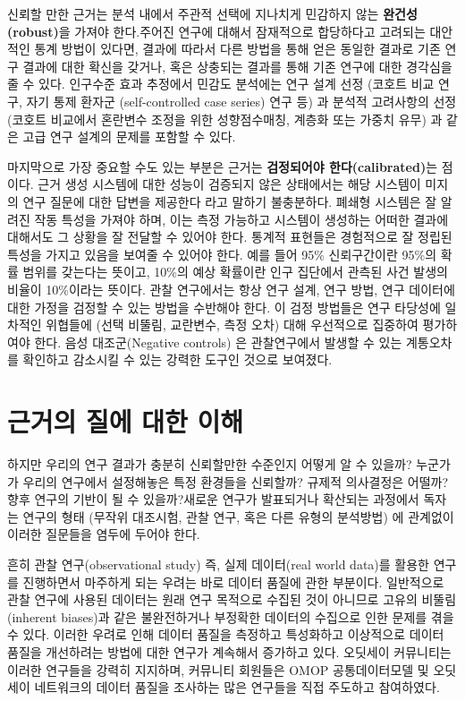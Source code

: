 \documentclass[11pt]{book}
\theoremstyle{definition}
\theoremstyle{definition}
\theoremstyle{definition}
\theoremstyle{remark}
\begin{document}
신뢰할 만한 근거는 분석 내에서 주관적 선택에 지나치게 민감하지 않는
\textbf{완건성(robust)}을 가져야 한다.주어진 연구에 대해서 잠재적으로
합당하다고 고려되는 대안적인 통계 방법이 있다면, 결과에 따라서 다른
방법을 통해 얻은 동일한 결과로 기존 연구 결과에 대한 확신을 갖거나, 혹은
상충되는 결과를 통해 기존 연구에 대한 경각심을 줄 수 있다.
\citep{madigan2013design} 인구수준 효과 추정에서 민감도 분석에는 연구
설계 선정 (코호트 비교 연구, 자기 통제 환자군 (self-controlled case
series) 연구 등) 과 분석적 고려사항의 선정 (코호트 비교에서 혼란변수
조정을 위한 성향점수매칭, 계층화 또는 가중치 유무) 과 같은 고급 연구
설계의 문제를 포함할 수 있다.

마지막으로 가장 중요할 수도 있는 부분은 근거는 \textbf{검정되어야
한다(calibrated)}는 점이다. 근거 생성 시스템에 대한 성능이 검증되지 않은
상태에서는 해당 시스템이 미지의 연구 질문에 대한 답변을 제공한다 라고
말하기 불충분하다. 폐쇄형 시스템은 잘 알려진 작동 특성을 가져야 하며,
이는 측정 가능하고 시스템이 생성하는 어떠한 결과에 대해서도 그 상황을 잘
전달할 수 있어야 한다. 통계적 표현들은 경험적으로 잘 정립된 특성을
가지고 있음을 보여줄 수 있어야 한다. 예를 들어 95\% 신뢰구간이란 95\%의
확률 범위를 갖는다는 뜻이고, 10\%의 예상 확률이란 인구 집단에서 관측된
사건 발생의 비율이 10\%이라는 뜻이다. 관찰 연구에서는 항상 연구 설계,
연구 방법, 연구 데이터에 대한 가정을 검정할 수 있는 방법을 수반해야
한다. 이 검정 방법들은 연구 타당성에 일차적인 위협들에 (선택 비뚤림,
교란변수, 측정 오차) 대해 우선적으로 집중하여 평가하여야 한다. 음성
대조군(Negative controls) 은 관찰연구에서 발생할 수 있는 계통오차를
확인하고 감소시킬 수 있는 강력한 도구인 것으로 보여졌다.
\citep{schuemie_2016, schuemie_2018, schuemie_2018b}

\section{근거의 질에 대한 이해}\label{---}

하지만 우리의 연구 결과가 충분히 신뢰할만한 수준인지 어떻게 알 수
있을까? 누군가가 우리의 연구에서 설정해놓은 특정 환경들을 신뢰할까?
규제적 의사결정은 어떨까? 향후 연구의 기반이 될 수 있을까?새로운 연구가
발표되거나 확산되는 과정에서 독자는 연구의 형태 (무작위 대조시험, 관찰
연구, 혹은 다른 유형의 분석방법) 에 관계없이 이러한 질문들을 염두에
두어야 한다.  

흔히 관찰 연구(observational study) 즉, 실제 데이터(real world data)를
활용한 연구를 진행하면서 마주하게 되는 우려는 바로 데이터 품질에 관한
부분이다. \citep{botsis2010secondary, hersh2013caveats, sherman2016real}
일반적으로 관찰 연구에 사용된 데이터는 원래 연구 목적으로 수집된 것이
아니므로 고유의 비뚤림(inherent biases)과 같은 불완전하거나 부정확한
데이터의 수집으로 인한 문제를 겪을 수 있다. 이러한 우려로 인해 데이터
품질을 측정하고 특성화하고 이상적으로 데이터 품질을 개선하려는 방법에
대한 연구가 계속해서 증가하고 있다.
\citep{kahn2012pragmatic, liaw2013towards, weiskopf_2013} 오딧세이
커뮤니티는 이러한 연구들을 강력히 지지하며, 커뮤니티 회원들은 OMOP
공통데이터모델 및 오딧세이 네트워크의 데이터 품질을 조사하는 많은
연구들을 직접 주도하고 참여하였다.
\citep{huser_multisite_2016, kahn_transparent_2015, callahan2017comparison, yoon_2016}
 
\end{document}
